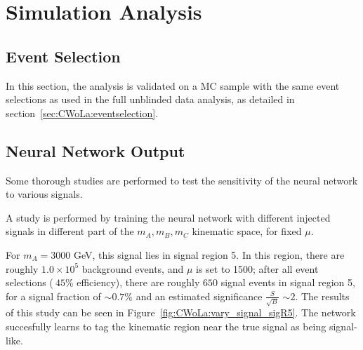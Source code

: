 
\FloatBarrier
\section{Simulation Analysis}
\label{sec:CWoLa:simulation_analysis}
\subsection{Event Selection}
In this section, the analysis is validated on a MC sample with the same event selections as used in the full unblinded data analysis, as detailed in section~\ref{sec:CWoLa:eventselection}.

\subsection{Neural Network Output}
\label{sec:CWoLa:simulation:NN}

Some thorough studies are performed to test the sensitivity of the neural network to various signals.


A study is performed by training the neural network with different injected signals in different part of the $m_A,m_B,m_C$ kinematic space, for fixed $\mu$.

For $m_A=3000$ GeV, this signal lies in signal region 5.
In this region, there are roughly $1.0\times10^5$ background events, and $\mu$ is set to 1500; after all event selections ($~45\%$ efficiency), there are roughly $650$ signal events in signal region 5, for a signal fraction of $\sim 0.7\%$ and an estimated significance $\frac{S}{\sqrt{B}}$ $\sim 2$.
The results of this study can be seen in Figure~\ref{fig:CWoLa:vary_signal_sigR5}.
The network succesfully learns to tag the kinematic region near the true signal as being signal-like.

